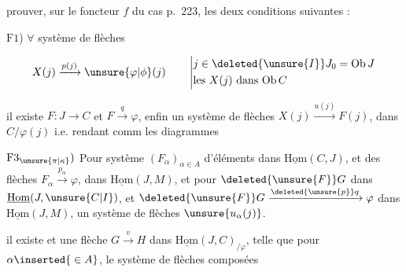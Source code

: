 
prouver, sur le foncteur $f$ du cas p.~223, les deux conditions suivantes :

$\mathrm{F}1$)  $\forall$ système  de flèches 

\[
X(j)\xrightarrow{p(j)}\unsure{\varphi|\phi}(j)
\qquad\left|\begin{aligned}
&j\in\deleted{\unsure{I}}J_0=\mathrm{Ob}\,J\\
&\text{les }X(j)\text{ dans }\mathrm{Ob}\,C
\end{aligned}\right.
\]

il existe  $F:J\longrightarrow C$ et $F\xrightarrow{q}\varphi$, enfin un système de flèches $X(j)\xrightarrow{u(j)}F(j)$,  dans  $C/\varphi(j)$ i.e. rendant comm les diagrammes 


$\mathrm{F}3_{\unsure{\pi|\kappa}})$ Pour  système $(F_\alpha)_{\alpha\in A}$   d'éléments dans  $\underline{\mathrm{Hom}}(C,J)$, et des flèches $F_\alpha\xrightarrow{p_\alpha}\varphi$, dans $\underline{\mathrm{Hom}}(J,M)$, et pour $\deleted{\unsure{F}}G$ dans $\underline{\mathrm{Hom}}(J,\unsure{C|I})$, et $\deleted{\unsure{F}}G\xrightarrow{\deleted{\unsure{p}}q}\varphi$ dans $\underline{\mathrm{Hom}}(J,M)$,  un système de flèches $\unsure{u_\alpha(j)}$.




il existe   et une  flèche $G\xrightarrow{v}H$ dans $\underline{\mathrm{Hom}}(J,C)_{/\varphi}$, telle que pour  $\alpha\inserted{{}\in A}$, le système de flèches composées

